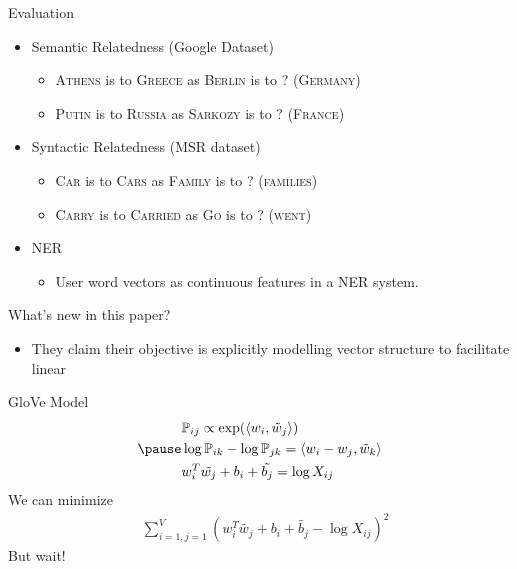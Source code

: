\begin{frame}{Evaluation}
  \begin{itemize}
  \item Semantic Relatedness (Google Dataset) %
    \begin{itemize}
    \item \textsc{Athens} is to \textsc{Greece} as \textsc{Berlin} is to ? (\textsc{Germany})
    \item \textsc{Putin} is to \textsc{Russia} as \textsc{Sarkozy} is to ? (\textsc{France})
    \end{itemize}
  \item Syntactic Relatedness (MSR dataset) %
    \begin{itemize}
    \item \textsc{Car} is to \textsc{Cars} as \textsc{Family} is to ? (\textsc{families})
    \item \textsc{Carry} is to \textsc{Carried} as \textsc{Go} is to ? (\textsc{went})
    \end{itemize}
  \item NER 
    \begin{itemize}
    \item User word vectors as continuous features in a NER system.
    \end{itemize}
  \end{itemize}
\end{frame}

\begin{frame}{What's new in this paper?}
  \begin{itemize}
  \item They claim their objective is explicitly modelling vector structure to facilitate linear 
  \end{itemize}
\end{frame}

\begin{frame}{GloVe Model}
  \begin{align*}
    & \Pr_{ij} \propto \exp(\dotprod{w_i}{\tilde{w}_j}) \\
    \pause
    & \log \Pr_{ik} - \log\Pr_{jk} = \dotprod{w_i -w_j}{\tilde{w}_k}\\
    & w_i^T\tilde{w_j} +b_i + \tilde{b_j} = \log X_{ij} \\
  \end{align*}
  \pause
  We can minimize 
  \begin{align*}
    & \text{} \sum_{i=1,j=1}^V \left( w_i^T\tilde{w_j} +b_i + \tilde{b_j} - \log X_{ij} \right)^2
  \end{align*}
  \pause
  But wait!
\end{frame}

